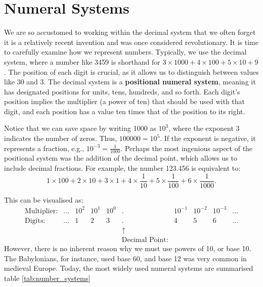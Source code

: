 \chapter{Numeral Systems}
\label{chap:ch3}

We are so accustomed to working within the decimal system that we often forget it is a relatively recent invention and was once considered revolutionary. It is time to carefully examine how we represent numbers. Typically, we use the decimal system, where a number like 3459 is shorthand for \(3 \times 1000 + 4 \times 100 + 5 \times 10 + 9\). The position of each digit is crucial, as it allows us to distinguish between values like 30 and 3. The decimal system is a\textbf{ positional numeral system}, meaning it has designated positions for units, tens, hundreds, and so forth. Each digit’s position implies the multiplier (a power of ten) that should be used with that digit, and each position has a value ten times that of the position to its right.

Notice that we can save space by writing 1000 as \(10^3\), where the exponent 3 indicates the number of zeros. Thus, \(100000 = 10^5\). If the exponent is negative, it represents a fraction, e.g., \(10^{-3} = \frac{1}{1000}\). Perhaps the most ingenious aspect of the positional system was the addition of the decimal point, which allows us to include decimal fractions. For example, the number 123.456 is equivalent to:
\[
1 \times 100 + 2 \times 10 + 3 \times 1 + 4 \times \frac{1}{10} + 5 \times \frac{1}{100} + 6 \times \frac{1}{1000}.
\]

This can be visualised as:
\[
\begin{array}{rccccccccc}
\text{Multiplier:} & \ldots & 10^2 & 10^1 & 10^0 & . & 10^{-1} & 10^{-2} & 10^{-3} & \ldots \\
\text{Digits:} & \ldots & 1 & 2 & 3 & . & 4 & 5 & 6 &\ldots \\
& & & & & \uparrow & & & & \\
& & & & & \text{Decimal Point:} & & & &
\end{array}
\]
However, there is no inherent reason why we must use powers of 10, or base 10. The Babylonians, for instance, used base 60, and base 12 was very common in medieval Europe. Today, the most widely used numeral systems are summarised table \ref{tab:number_systems}

